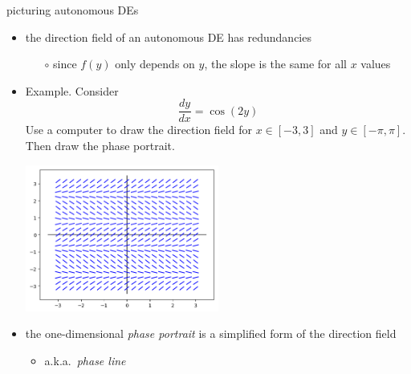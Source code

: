 \documentclass[colorlinks]{beamer}
\begin{document}
\begin{frame}{picturing autonomous DEs}

\begin{itemize}
\item the direction field of an autonomous DE has redundancies
    \begin{itemize}
    \item[$\circ$] since $f(y)$ only depends on $y$, the slope is the same for all $x$ values
    \end{itemize}

\medskip
\item \begin{minipage}[t]{0.35\textwidth} \small
Example.  Consider
$$\frac{dy}{dx} = \cos(2y)$$
Use a computer to draw the direction field for $x \in [-3,3]$ and $y\in [-\pi,\pi]$.  Then draw the phase portrait.
\end{minipage}

\vspace{-35mm}
\hfill \includegraphics[width=0.5\textwidth]{figs/autonomous-cos} \phantom{ld}

\bigskip
\item the one-dimensional \emph{phase portrait} is a simplified form of the direction field
    \begin{itemize}
    \item a.k.a.~\emph{phase line}
    \end{itemize}

\end{itemize}
\end{frame}
\end{document}
